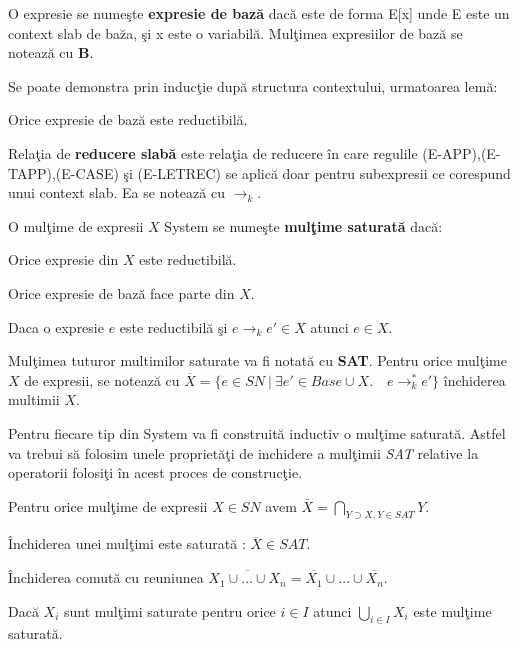 \begin{definition}
O expresie se nume\c ste \textbf{expresie de baz\u a} dac\u a este de forma E[x] unde E este un context slab de ba\u za, \c si x este o variabil\u a. Mul\c timea expresiilor de baz\u a se noteaz\u a cu \textbf{B}.
\end{definition}

Se poate demonstra prin induc\c tie dup\u a structura contextului, urmatoarea lem\u a:
\begin{lemma}
Orice expresie de baz\u a este reductibil\u a.
\end{lemma}

\begin{definition}
Rela\c tia de \textbf{reducere slab\u a} este rela\c tia de reducere \^ in care regulile {\scriptsize (E-APP),(E-TAPP),(E-CASE)} \c si {\scriptsize (E-LETREC)} se aplic\u a doar pentru subexpresii ce corespund unui context slab. Ea se noteaz\u a cu $\to_k$.
\end{definition}

\begin{definition}
O mul\c time de expresii $X$ System \fhat se nume\c ste \textbf{mul\c time saturat\u a} dac\u a:
\begin{enumerate*}
\item Orice expresie din $X$ este reductibil\u a.
\item Orice expresie de baz\u a face parte din $X$.
\item Daca o expresie $e$ este reductibil\u a \c si $e \to_k e' \in X$ atunci $e \in X$.
\end{enumerate*}
Mul\c timea tuturor multimilor saturate va fi notat\u a cu \textbf{SAT}. Pentru orice mul\c time $X$ de expresii, se noteaz\u a cu $\overline{X} = \{ e \in SN \ |\ \exists e' \in Base \cup X. \quad e \to_k^* e'\}$ \^ inchiderea multimii $X$.
\end{definition}

Pentru fiecare tip din System \fhat va fi construit\u a inductiv o mul\c time saturat\u a. Astfel va trebui s\u a folosim unele propriet\u a\c ti de inchidere a mul\c timii \emph{SAT} relative la operatorii folosi\c ti \^ in acest proces de construc\c tie.

\begin{lemma}
\begin{enumerate*}
\item Pentru orice mul\c time de expresii $X \in SN$ avem $\overline{X} = \bigcap_{Y \supset X, Y \in SAT}Y $.
\item \^ Inchiderea unei mul\c timi este saturat\u a : $\overline{X} \in SAT$.
\item \^ Inchiderea comut\u a cu reuniunea $\overline{X_1 \cup \dots \cup X_n} = \overline{X_1} \cup \dots \cup \overline{X_n}$.
\item Dac\u a $X_i$ sunt mul\c timi saturate pentru orice $i \in I$ atunci $\bigcup_{i \in I} X_i$ este mul\c time saturat\u a.
\end{enumerate*}
\end{lemma}

